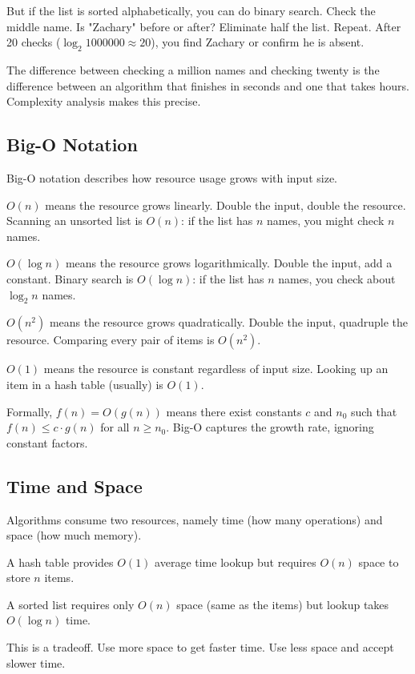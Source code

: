 But if the list is sorted alphabetically, you can do binary search. Check the middle name. Is "Zachary" before or after? Eliminate half the list. Repeat. After 20 checks ($\log_2 1000000 \approx 20$), you find Zachary or confirm he is absent.

The difference between checking a million names and checking twenty is the difference between an algorithm that finishes in seconds and one that takes hours. Complexity analysis makes this precise.

\subsection{Big-O Notation}

Big-O notation describes how resource usage grows with input size.

$O(n)$ means the resource grows linearly. Double the input, double the resource. Scanning an unsorted list is $O(n)$: if the list has $n$ names, you might check $n$ names.

$O(\log n)$ means the resource grows logarithmically. Double the input, add a constant. Binary search is $O(\log n)$: if the list has $n$ names, you check about $\log_2 n$ names.

$O(n^2)$ means the resource grows quadratically. Double the input, quadruple the resource. Comparing every pair of items is $O(n^2)$.

$O(1)$ means the resource is constant regardless of input size. Looking up an item in a hash table (usually) is $O(1)$.

Formally, $f(n) = O(g(n))$ means there exist constants $c$ and $n_0$ such that $f(n) \leq c \cdot g(n)$ for all $n \geq n_0$. Big-O captures the growth rate, ignoring constant factors.

\subsection{Time and Space}

Algorithms consume two resources, namely time (how many operations) and space (how much memory).

A hash table provides $O(1)$ average time lookup but requires $O(n)$ space to store $n$ items.

A sorted list requires only $O(n)$ space (same as the items) but lookup takes $O(\log n)$ time.

This is a tradeoff. Use more space to get faster time. Use less space and accept slower time.

